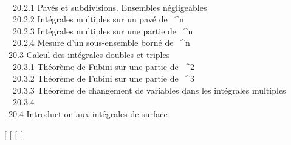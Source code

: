 \documentclass[]{article}
\begin{document}
 \\
~~20.2.1 {Pavés et
subdivisions. Ensembles négligeables} \\ ~~20.2.2
{Intégrales multiples sur un
pavé de ~^n} \\ ~~20.2.3
{Intégrales multiples sur une
partie de ~^n} \\ ~~20.2.4
{Mesure d'un sous-ensemble
borné de ~^n} \\ ~20.3
{Calcul des intégrales doubles et
triples} \\ ~~20.3.1 {Théorème
de Fubini sur une partie de ~^2} \\ ~~20.3.2
{Théorème de Fubini sur une
partie de ~^3} \\ ~~20.3.3
{Théorème de changement de
variables dans les intégrales multiples} \\ ~~20.3.4
 \\
~20.4 {Introduction aux
intégrales de surface}

{[}
{[}
{[}
{[}
\end{document}
